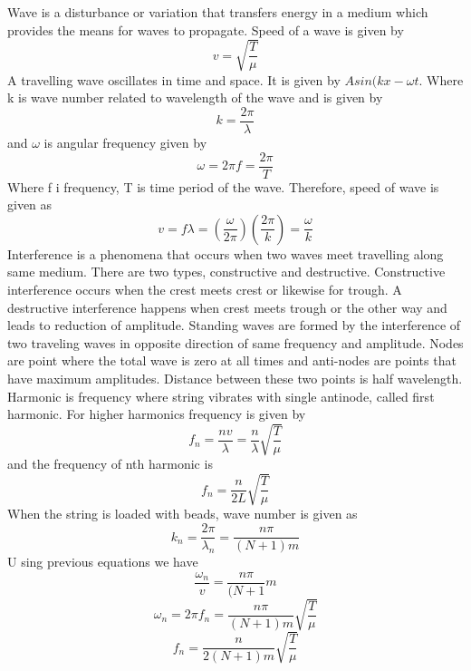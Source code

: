 Wave is a disturbance or variation that transfers energy in a medium which provides the means for waves to propagate. Speed of a wave is given by 
\begin{equation}
v = \sqrt{\frac{T}{\mu}} 
\end{equation} 
A travelling wave oscillates in time and space. It is given by $Asin(kx-\omega t$. Where k is wave number related to wavelength of the wave and is given by 
\begin{equation}
    k=\frac{2\pi}{\lambda} \end{equation} 
and $\omega$ is angular frequency given by 
\begin{equation}
    \omega = 2\pi f = \frac{2\pi}{T}
\end{equation} Where f i frequency, T is time period of the wave. Therefore, speed of wave is given as \begin{equation}
    v=f \lambda = (\frac{\omega}{2\pi})(\frac{2\pi}{k}) = \frac{\omega}{k}
\end{equation} 
Interference is a phenomena that occurs when two waves meet travelling along same medium. There are two types, constructive and destructive. Constructive interference occurs when the crest meets crest or likewise for trough. A destructive interference happens when crest meets trough or the other way and leads to reduction of amplitude. 
Standing waves are formed by the interference of two traveling waves in opposite direction of same frequency and amplitude. Nodes are point where the total wave is zero at all times and anti-nodes are points that have maximum amplitudes. Distance between these two points is half wavelength. Harmonic is frequency where string vibrates with single antinode, called first harmonic. For higher harmonics frequency is given by \begin{equation}
    f_n = \frac{nv}{\lambda} = \frac{n}{\lambda} \sqrt{\frac{T}{\mu}}
\end{equation} and the frequency of nth harmonic is \begin{equation}
    f_n = \frac{n}{2L} \sqrt{\frac{T}{\mu}}
\end{equation}
When the string is loaded with beads, wave number is given as 
\begin{equation}
    k_n = \frac{2\pi}{\lambda_n} = \frac{n\pi}{(N+1)m}
\end{equation} U
sing previous equations we have \begin{equation}
    \frac{\omega_n}{v}=\frac{n\pi}{(N+1}m
\end{equation}
\begin{equation}
    \omega_n = 2\pi f_n=\frac{n\pi}{(N+1)m} \sqrt{\frac{T}{\mu}}
\end{equation}
\begin{equation}
    f_n = \frac{n}{2(N+1)m} \sqrt{\frac{T}{\mu}}
\end{equation}


